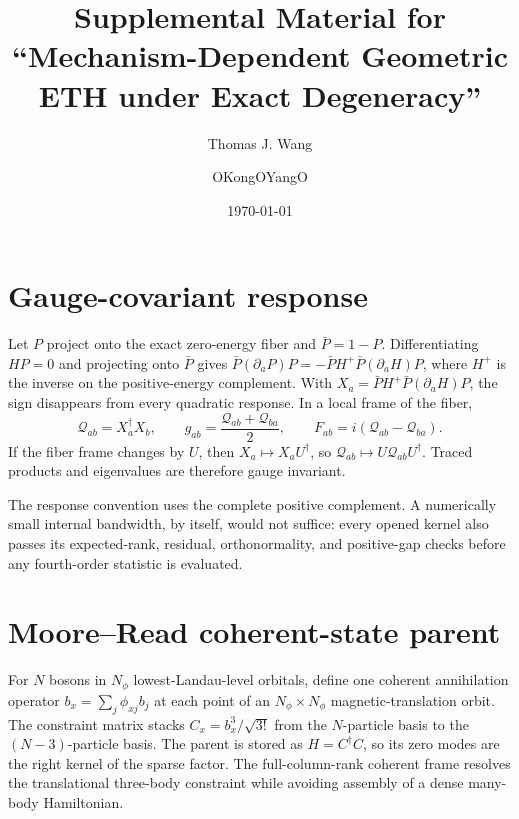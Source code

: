 \documentclass[aps,prb,onecolumn,superscriptaddress,longbibliography,floatfix]{revtex4-2}
\newcommand{\cQ}{\mathcal Q}
\begin{document}
\title{Supplemental Material for ``Mechanism-Dependent Geometric ETH under Exact Degeneracy''}

\author{Thomas J. Wang}

\author{OKongOYangO}

\date{\today}

\maketitle

\section{Gauge-covariant response}
\label{app:response}

Let \(P\) project onto the exact zero-energy fiber and \(\bar P=1-P\). Differentiating \(HP=0\) and projecting onto \(\bar P\) gives \(\bar P(\partial_aP)P=-\bar PH^+\bar P(\partial_aH)P\), where \(H^+\) is the inverse on the positive-energy complement. With \(X_a=\bar PH^+\bar P(\partial_aH)P\), the sign disappears from every quadratic response. In a local frame of the fiber,
\begin{equation}
\cQ_{ab}=X_a^\dagger X_b,\qquad g_{ab}=\frac{\cQ_{ab}+\cQ_{ba}}{2},\qquad F_{ab}=i(\cQ_{ab}-\cQ_{ba}).
\label{eq:supp-qgt}
\end{equation}
If the fiber frame changes by \(U\), then \(X_a\mapsto X_aU^\dagger\), so \(\cQ_{ab}\mapsto U\cQ_{ab}U^\dagger\). Traced products and eigenvalues are therefore gauge invariant.

The response convention uses the complete positive complement. A numerically small internal bandwidth, by itself, would not suffice: every opened kernel also passes its expected-rank, residual, orthonormality, and positive-gap checks before any fourth-order statistic is evaluated.

\section{Moore--Read coherent-state parent}
\label{app:mr}

For \(N\) bosons in \(N_\phi\) lowest-Landau-level orbitals, define one coherent annihilation operator \(b_x=\sum_j\phi_{xj}b_j\) at each point of an \(N_\phi\times N_\phi\) magnetic-translation orbit. The constraint matrix stacks \(C_x=b_x^3/\sqrt{3!}\) from the \(N\)-particle basis to the \((N-3)\)-particle basis. The parent is stored as \(H=C^\dagger C\), so its zero modes are the right kernel of the sparse factor. The full-column-rank coherent frame resolves the translational three-body constraint while avoiding assembly of a dense many-body Hamiltonian.
\end{document}
